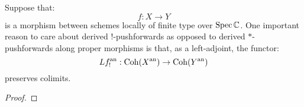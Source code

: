             \begin{remark}
                Suppose that:
                    $$f: X \to Y$$
                is a morphism between schemes locally of finite type over $\operatorname{Spec} \mathbb{C}$. One important reason to care about derived $!$-pushforwards as opposed to derived $*$-pushforwards along proper morphisms is that, as a left-adjoint, the functor:
                    $$Lf^{\mathrm{an}}_!: \mathrm{Coh}(X^{\mathrm{an}}) \to \mathrm{Coh}(Y^{\mathrm{an}})$$
                preserves colimits. 
            \end{remark}
            \begin{theorem} \label{theorem: relative_analytification_of_coherent_modules}
                
            \end{theorem}
                \begin{proof}
                    
                \end{proof}
        
    \printbibliography

